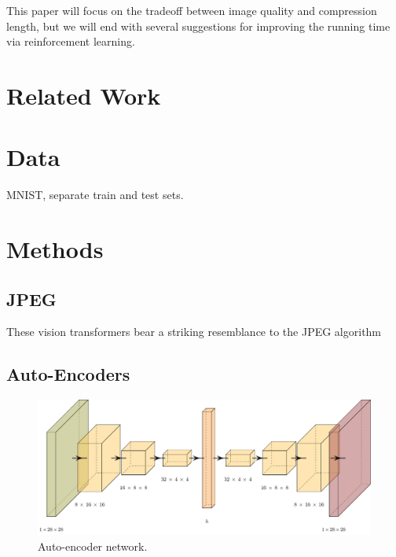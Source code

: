 \documentclass[11pt]{article}
\begin{document}
This paper will focus on the tradeoff between image quality and compression length, but we will end with several suggestions for improving the running time via reinforcement learning.


\section{Related Work}

\section{Data}

MNIST, separate train and test sets.

\section{Methods}

\subsection{JPEG}\label{sec:jpeg}

These vision transformers bear a striking resemblance to the JPEG algorithm

\subsection{Auto-Encoders}

\begin{figure}[t]
  \centering
  \includegraphics[width=2\columnwidth]{diagrams/auto.pdf}
  \caption{Auto-encoder network.}
  \label{fig:auto}
\end{figure}
\end{document}
